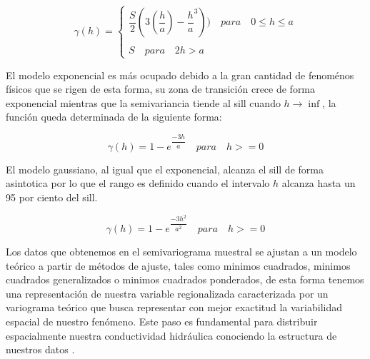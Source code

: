 \begin{equation}
\gamma(h)= \left\{ \begin{array}{lcc}
             \dfrac{S}{2}(3(\dfrac{h}{a})-\dfrac{h}{a}^{3})) \quad para \quad 0 \leq h \leq a \\
             \\ S \quad  para \quad 2  h > a  
             \end{array}
   \right.
\end{equation}

El modelo exponencial es más ocupado debido a la gran cantidad de fenoménos físicos que se rigen de esta forma, su zona de transición crece de forma exponencial mientras que la semivariancia tiende al sill cuando $h\rightarrow\inf$, la función queda determinada de la siguiente forma:

\begin{equation}
\gamma(h)=1-e^{\dfrac{-3h}{a}} \quad para \quad h>=0
\end{equation}

El modelo gaussiano, al igual que el exponencial, alcanza el sill de forma asintotica por lo que el rango es definido cuando el intervalo $h$ alcanza hasta un 95 por ciento del sill.

\begin{equation}
\gamma(h)=1-e^{\dfrac{-3h^{2}}{a^{2}}} \quad para \quad h >= 0    
\end{equation}

Los datos que obtenemos en el semivariograma muestral se ajustan a un modelo teórico a partir de métodos de ajuste, tales como minimos cuadrados, minimos cuadrados generalizados o minimos cuadrados ponderados, de esta forma tenemos una representación de nuestra variable regionalizada caracterizada por un variograma teórico que busca representar con mejor exactitud la variabilidad espacial de nuestro fenómeno. Este paso es fundamental para distribuir espacialmente nuestra conductividad hidráulica conociendo la estructura de nuestros datos \cite{Gallardo2006}.

